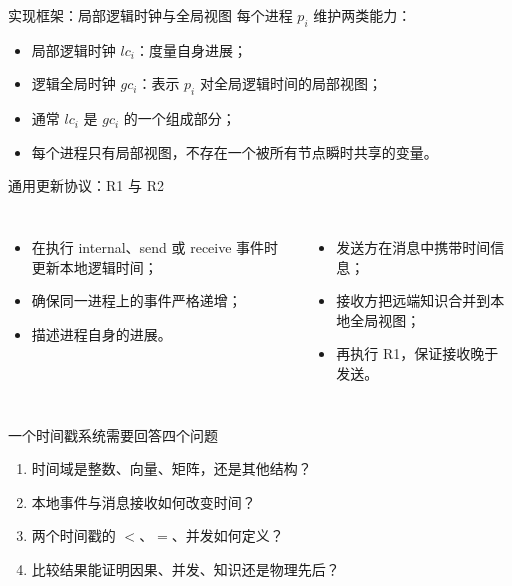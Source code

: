 \documentclass[UTF8,fontset=none,aspectratio=169,10pt]{beamer}
\begin{document}
\begin{frame}{实现框架：局部逻辑时钟与全局视图}
每个进程 $p_i$ 维护两类能力：
\begin{itemize}
  \item 局部逻辑时钟 $lc_i$：度量自身进展；
  \item 逻辑全局时钟 $gc_i$：表示 $p_i$ 对全局逻辑时间的局部视图；
  \item 通常 $lc_i$ 是 $gc_i$ 的一个组成部分；
  \item 每个进程只有局部视图，不存在一个被所有节点瞬时共享的变量。
\end{itemize}
\vfill
{}
\end{frame}

\begin{frame}{通用更新协议：R1 与 R2}
\begin{columns}[T,onlytextwidth]
\begin{itemize}
  \item 在执行 internal、send 或 receive 事件时更新本地逻辑时间；
  \item 确保同一进程上的事件严格递增；
  \item 描述进程自身的进展。
\end{itemize}
\begin{itemize}
  \item 发送方在消息中携带时间信息；
  \item 接收方把远端知识合并到本地全局视图；
  \item 再执行 R1，保证接收晚于发送。
\end{itemize}
\end{columns}
\vfill
{}
\end{frame}

\begin{frame}{一个时间戳系统需要回答四个问题}
\begin{enumerate}
  \item {}时间域是整数、向量、矩阵，还是其他结构？
  \item {}本地事件与消息接收如何改变时间？
  \item {}两个时间戳的 $<$、$=$、并发如何定义？
  \item {}比较结果能证明因果、并发、知识还是物理先后？
\end{enumerate}
\vfill
\begin{center}
\end{center}
\end{frame}
\end{document}

